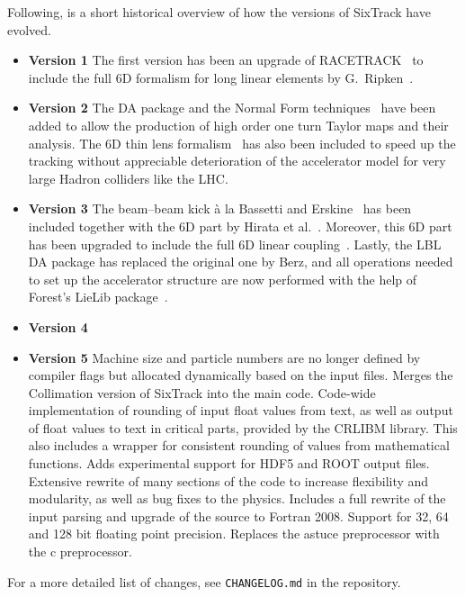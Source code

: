 Following, is a short historical overview of how the versions of SixTrack have evolved.
\begin{itemize}
    \item \textbf{Version 1}
        The first version has been an upgrade of RACETRACK~\cite{RACETRACK} to include the full 6D formalism for long linear elements by G.~Ripken~\cite{Ripken85}.
    \item \textbf{Version 2}
        The DA package and the Normal Form techniques~\cite{Berz89,Forest89} have been added to allow the production of high order one turn Taylor maps and their analysis.
        The 6D thin lens formalism~\cite{Ripken95} has also been included to speed up the tracking without appreciable deterioration of the accelerator model for very large Hadron colliders like the LHC.
    \item \textbf{Version 3}
        The beam--beam kick \`a la Bassetti and Erskine~\cite{BasErs} has been included together with the 6D part by Hirata et al.~\cite{Hirata}.
        Moreover, this 6D part has been upgraded to include the full 6D linear coupling~\cite{ripbeam}.
        Lastly, the LBL DA package has replaced the original one by Berz, and all operations needed to set up the accelerator structure are now performed with the help of Forest's LieLib package~\cite{DALIE}.
    \item \textbf{Version 4}
    \item \textbf{Version 5}
        Machine size and particle numbers are no longer defined by compiler flags but allocated dynamically based on the input files.
        Merges the Collimation version of SixTrack into the main code.
        Code-wide implementation of rounding of input float values from text, as well as output of float values to text in critical parts, provided by the CRLIBM library.
        This also includes a wrapper for consistent rounding of values from mathematical functions.
        Adds experimental support for HDF5 and ROOT output files.
        Extensive rewrite of many sections of the code to increase flexibility and modularity, as well as bug fixes to the physics.
        Includes a full rewrite of the input parsing and upgrade of the source to Fortran 2008.
        Support for 32, 64 and 128 bit floating point precision.
        Replaces the astuce preprocessor with the c preprocessor.
\end{itemize}

For a more detailed list of changes, see \texttt{CHANGELOG.md} in the repository.

